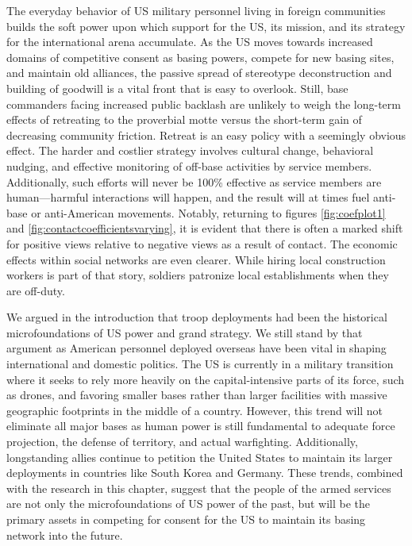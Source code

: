 The everyday behavior of US military personnel living in foreign communities builds the soft power upon which support for the US, its mission, and its strategy for the international arena accumulate. As the US moves towards increased domains of competitive consent as basing powers, compete for new basing sites, and maintain old alliances, the passive spread of stereotype deconstruction and building of goodwill is a vital front that is easy to overlook. Still, base commanders facing increased public backlash are unlikely to weigh the long-term effects of retreating to the proverbial motte versus the short-term gain of decreasing community friction. Retreat is an easy policy with a seemingly obvious effect. The harder and costlier strategy involves cultural change, behavioral nudging, and effective monitoring of off-base activities by service members. Additionally, such efforts will never be 100\% effective as service members are human---harmful interactions will happen, and the result will at times fuel anti-base or anti-American movements. Notably, returning to figures \ref{fig:coefplot1} and \ref{fig:contactcoefficientsvarying}, it is evident that there is often a marked shift for positive views relative to negative views as a result of contact. The economic effects within social networks are even clearer. While hiring local construction workers is part of that story, soldiers patronize local establishments when they are off-duty.

We argued in the introduction that troop deployments had been the historical microfoundations of US power and grand strategy. We still stand by that argument as American personnel deployed overseas have been vital in shaping international and domestic politics. The US is currently in a military transition where it seeks to rely more heavily on the capital-intensive parts of its force, such as drones, and favoring smaller bases rather than larger facilities with massive geographic footprints in the middle of a country. However, this trend will not eliminate all major bases as human power is still fundamental to adequate force projection, the defense of territory, and actual warfighting. Additionally, longstanding allies continue to petition the United States to maintain its larger deployments in countries like South Korea and Germany. These trends, combined with the research in this chapter, suggest that the people of the armed services are not only the microfoundations of US power of the past, but will be the primary assets in competing for consent for the US to maintain its basing network into the future.
